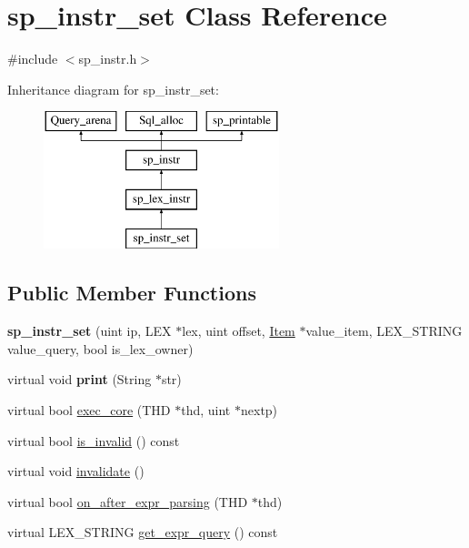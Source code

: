 \hypertarget{classsp__instr__set}{}\section{sp\+\_\+instr\+\_\+set Class Reference}
\label{classsp__instr__set}


{\ttfamily \#include $<$sp\+\_\+instr.\+h$>$}

Inheritance diagram for sp\+\_\+instr\+\_\+set\+:\begin{figure}[H]
\begin{center}
\leavevmode
\includegraphics[height=4.000000cm]{classsp__instr__set}
\end{center}
\end{figure}
\subsection*{Public Member Functions}
\begin{DoxyCompactItemize}
\item 
\mbox{\label{classsp__instr__set_a1c741a6122afc4ddc49252bc5b91eddc}} 
{\bfseries sp\+\_\+instr\+\_\+set} (uint ip, L\+EX $\ast$lex, uint offset, \mbox{\hyperlink{classItem}{Item}} $\ast$value\+\_\+item, L\+E\+X\+\_\+\+S\+T\+R\+I\+NG value\+\_\+query, bool is\+\_\+lex\+\_\+owner)
\item 
\mbox{\label{classsp__instr__set_a978c437834f9752df50b86036b3eaf1c}} 
virtual void {\bfseries print} (String $\ast$str)
\item 
virtual bool \mbox{\hyperlink{classsp__instr__set_adc6287f3c6cce44e717167cec46a0149}{exec\+\_\+core}} (T\+HD $\ast$thd, uint $\ast$nextp)
\item 
virtual bool \mbox{\hyperlink{classsp__instr__set_af9865816c222a82cb3bad59b428ddf77}{is\+\_\+invalid}} () const
\item 
virtual void \mbox{\hyperlink{classsp__instr__set_a4c871b1b9db55d27231d512a8eef9285}{invalidate}} ()
\item 
virtual bool \mbox{\hyperlink{classsp__instr__set_aef30b17435828a33ac1f1e60081bc194}{on\+\_\+after\+\_\+expr\+\_\+parsing}} (T\+HD $\ast$thd)
\item 
virtual L\+E\+X\+\_\+\+S\+T\+R\+I\+NG \mbox{\hyperlink{classsp__instr__set_a13de9a0560941323d3cc7c9918e00036}{get\+\_\+expr\+\_\+query}} () const
\end{DoxyCompactItemize}
